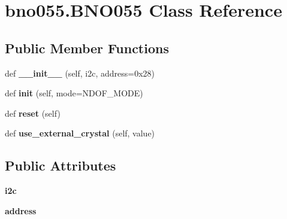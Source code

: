 \hypertarget{classbno055_1_1BNO055}{}\section{bno055.\+B\+N\+O055 Class Reference}
\label{classbno055_1_1BNO055}
\subsection*{Public Member Functions}
\begin{DoxyCompactItemize}
\item 
\mbox{\label{classbno055_1_1BNO055_a11bd13a73c6afa6e60852b00278bb7c5}} 
def {\bfseries \+\_\+\+\_\+init\+\_\+\+\_\+} (self, i2c, address=0x28)
\item 
\mbox{\label{classbno055_1_1BNO055_a91bc589bb69785b90cf4d977466176e4}} 
def {\bfseries init} (self, mode=N\+D\+O\+F\+\_\+\+M\+O\+DE)
\item 
\mbox{\label{classbno055_1_1BNO055_a61844cfbd98632496466c6dc9786d0b5}} 
def {\bfseries reset} (self)
\item 
\mbox{\label{classbno055_1_1BNO055_ae594385255f25c392b8750eaec3aff6f}} 
def {\bfseries use\+\_\+external\+\_\+crystal} (self, value)
\end{DoxyCompactItemize}
\subsection*{Public Attributes}
\begin{DoxyCompactItemize}
\item 
\mbox{\label{classbno055_1_1BNO055_a6e4029bdf98339217b2ca55ae0263dfa}} 
{\bfseries i2c}
\item 
\mbox{\label{classbno055_1_1BNO055_ab2c98347acfdaf404889010b780bbad4}} 
{\bfseries address}
\end{DoxyCompactItemize}
